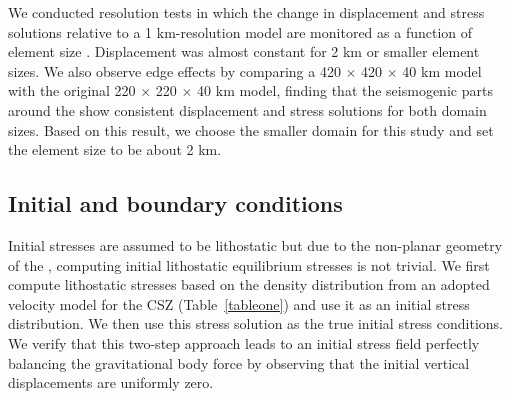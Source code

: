 \documentclass[draft]{agujournal2018}
\begin{document}
We conducted resolution tests in which the change in displacement and stress solutions relative to a 1 km-resolution model are monitored as a function of element size . Displacement was almost constant for 2 km or smaller element sizes.  We also observe edge effects by comparing a 420 $\times$ 420 $\times$ 40 km model with the original 220 $\times$ 220 $\times$ 40 km model, finding that the seismogenic parts around the  show consistent displacement and stress solutions for both domain sizes. Based on this result, we choose the smaller domain for this study and set the element size to be about 2 km. 




\subsection{Initial and boundary conditions}
\label{Initial_and_boundary_conditions}
Initial stresses are assumed to be lithostatic but due to the non-planar geometry of the , computing initial lithostatic equilibrium stresses is not trivial. We first compute lithostatic stresses based on the density distribution from an adopted velocity model for the CSZ (Table~\ref{tableone}) and use it as an initial stress distribution. We then use this stress solution as the true initial stress conditions. We verify that this two-step approach leads to an initial stress field perfectly balancing the gravitational body force by observing that the initial vertical displacements are uniformly zero.
\end{document}
